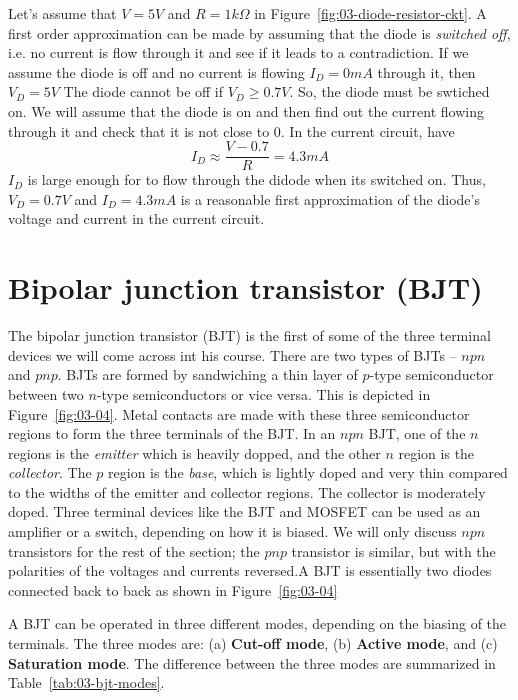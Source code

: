 Let's assume that $V=5V$ and $R=1k\Omega$ in Figure~\ref{fig:03-diode-resistor-ckt}. A first order approximation can be made by assuming that the diode is \textit{switched off}, i.e. no current is flow through it and see if it leads to a contradiction. If we assume the diode is off and no current is flowing $I_D = 0mA$ through it, then $V_D = 5V$ The diode cannot be off if $V_D \geq 0.7V$. So, the diode must be swtiched on. We will assume that the diode is on and then find out the current flowing through it and check that it is not close to 0. In the current circuit, have 
\begin{equation}
    I_D \approx \frac{V - 0.7}{R} = 4.3mA
    \label{eq:ch03-diode-resistor-id-approx}
\end{equation}
$I_D$ is large enough for to flow through the didode when its switched on. Thus, $V_D=0.7V$ and $I_D=4.3mA$ is a reasonable first approximation of the diode's voltage and current in the current circuit.

\section{Bipolar junction transistor (BJT)}
The bipolar junction transistor (BJT) is the first of some of the three terminal devices we will come across int his course. There are two types of BJTs -- $npn$ and $pnp$. BJTs are formed by sandwiching a thin layer of $p$-type semiconductor between two $n$-type semiconductors or vice versa. This is depicted in Figure~\ref{fig:03-04}. Metal contacts are made with these three semiconductor regions to form the three terminals of the BJT. In an $npn$ BJT, one of the  $n$ regions is the \textit{emitter} which is heavily dopped, and the other $n$ region is the \textit{collector}. The $p$ region is the \textit{base}, which is lightly doped and very thin compared to the widths of the emitter and collector regions. The collector is moderately doped. Three terminal devices like the BJT and MOSFET can be used as an amplifier or a switch, depending on how it is biased. We will only discuss $npn$ transistors for the rest of the section; the $pnp$ transistor is similar, but with the polarities of the voltages and currents reversed.A BJT is essentially two diodes connected back to back as shown in Figure~\ref{fig:03-04}

A BJT can be operated in three different modes, depending on the biasing of the terminals. The three modes are: (a) \textbf{Cut-off mode}, (b) \textbf{Active mode}, and (c) \textbf{Saturation mode}. The difference between the three modes are summarized in Table~\ref{tab:03-bjt-modes}.
